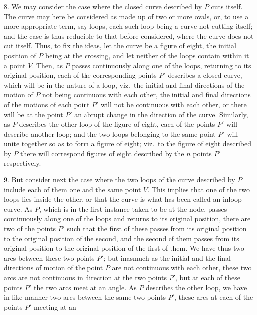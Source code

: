 \documentclass[11pt,a4paper]{article}
\begin{document}
\medskip

8. We may consider the case where the closed curve described by $P$ cuts itself. The curve may here be considered as made up of two or more ovals, or, to use a more appropriate term, say loops, each such loop being a curve not cutting itself; and the case is thus reducible to that before considered, where the curve does not cut itself. Thus, to fix the ideas, let the curve be a figure of eight, the initial position of $P$ being at the crossing, and let neither of the loops contain within it a point $V$. Then, as $P$ passes continuously along one of the loops, returning to its original position, each of the corresponding points $P'$ describes a closed curve, which will be in the nature of a loop, viz.\ the initial and final directions of the motion of $P$ not being continuous with each other, the initial and final directions of the motions of each point $P'$ will not be continuous with each other, or there will be at the point $P'$ an abrupt change in the direction of the curve. Similarly, as $P$ describes the other loop of the figure of eight, each of the points $P'$ will describe another loop; and the two loops belonging to the same point $P'$ will unite together so as to form a figure of eight; viz.\ to the figure of eight described by $P$ there will correspond figures of eight described by the $n$ points $P'$ respectively.

\medskip

9. But consider next the case where the two loops of the curve described by $P$ include each of them one and the same point $V$. This implies that one of the two loops lies inside the other, or that the curve is what has been called an inloop curve. As $P$, which is in the first instance taken to be at the node, passes continuously along one of the loops and returns to its original position, there are two of the points $P'$ such that the first of these passes from its original position to the original position of the second, and the second of them passes from its original position to the original position of the first of them. We have thus two arcs between these two points $P'$; but inasmuch as the initial and the final directions of motion of the point $P$ are not continuous with each other, these two arcs are not continuous in direction at the two points $P'$, but at each of these points $P'$ the two arcs meet at an angle. As $P$ describes the other loop, we have in like manner two arcs between the same two points $P'$, these arcs at each of the points $P'$ meeting at an
\end{document}
